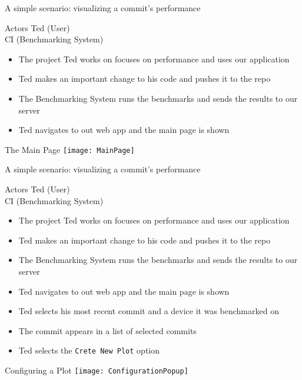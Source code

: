 \begin{frame}{A simple scenario: visualizing a commit's performance}
  \begin{block}{Actors}
    Ted (User)\\
    CI (Benchmarking System)
  \end{block}
  \begin{itemize}
    \item The project Ted works on focuses on performance and uses our application
    \item Ted makes an important change to his code and pushes it to the repo
    \item The Benchmarking System runs the benchmarks and sends the results to our server
    \item Ted navigates to out web app and the main page is shown
  \end{itemize}
\end{frame}

\begin{frame}{The Main Page}
  \texttt{[image: MainPage]}
\end{frame}

\begin{frame}{A simple scenario: visualizing a commit's performance}
  \begin{block}{Actors}
    Ted (User)\\
    CI (Benchmarking System)
  \end{block}
  \begin{itemize}
    \item The project Ted works on focuses on performance and uses our application
    \item Ted makes an important change to his code and pushes it to the repo
    \item The Benchmarking System runs the benchmarks and sends the results to our server
    \item Ted navigates to out web app and the main page is shown
    \item Ted selects his most recent commit and a device it was benchmarked on
    \item The commit appears in a list of selected commits
    \item Ted selects the \texttt{Crete New Plot} option
  \end{itemize}
\end{frame}

\begin{frame}{Configuring a Plot}
  \texttt{[image: ConfigurationPopup]}
\end{frame}


